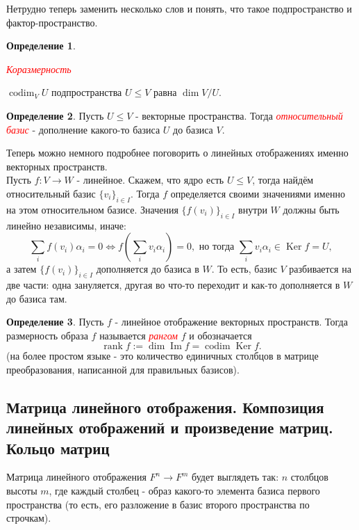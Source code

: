 \documentclass[a4paper,100pt]{article}
\theoremstyle{indented}
\theoremstyle{definition}
\newtheorem{defn}{Определение}
\theoremstyle{remark}
\DeclareMathOperator{\Ker}{Ker}
\DeclareMathOperator{\Imf}{Im}
\DeclareMathOperator{\codim}{codim}
\DeclareMathOperator{\rank}{rank}
\begin{document}
Нетрудно теперь заменить несколько слов и понять, что такое подпространство и фактор-пространство. 

\begin{defn}
    \hypertarget{n51}{\textcolor{red}{\textit{Коразмерность}}} $\codim_V U$ подпространства $U\leq V$ равна $\dim V/U$.
\end{defn}

\begin{defn}
    Пусть $U\leq V$ - векторные пространства. Тогда \hypertarget{n52}{\textcolor{red}{\textit{относительный базис}}} - дополнение какого-то базиса $U$ до базиса $V$.
\end{defn}

Теперь можно немного подробнее поговорить о линейных отображениях именно векторных пространств.\\ 

Пусть $f:V\rightarrow W$ - линейное. Скажем, что ядро есть $U\leq V$, тогда найдём относительный базис $\{v_i\}_{i\in I}$. Тогда $f$ определяется своими значениями именно на этом относительном базисе. Значения $\{f(v_i)\}_{i\in I}$ внутри $W$ должны быть линейно независимы, иначе:
\[
    \sum_i f(v_i)\alpha_i=0 \Leftrightarrow f(\sum_i v_i\alpha_i)=0, \text{ но тогда }\sum_i v_i\alpha_i\in \Ker f=U,
\]
а затем $\{f(v_i)\}_{i\in I}$ дополняется до базиса в $W$. То есть, базис $V$ разбивается на две части: одна зануляется, другая во что-то переходит и как-то дополняется в $W$ до базиса там.

\begin{defn}
    Пусть $f$ - линейное отображение векторных пространств. Тогда размерность образа $f$ называется \hypertarget{n53}{\textcolor{red}{\textit{рангом}}} $f$ и обозначается 
    \[
        \rank f:=\dim \Imf f=\codim \Ker f.
    \]
    (на более простом языке - это количество единичных столбцов в матрице преобразования, написанной для правильных базисов).
\end{defn}

\resetall

\subsection{Матрица линейного отображения. Композиция линейных отображений и произведение матриц. Кольцо матриц}

Матрица линейного отображения $F^n\rightarrow F^m$ будет выглядеть так: $n$ столбцов высоты $m$, где каждый столбец - образ какого-то элемента базиса первого пространства (то есть, его разложение в базис второго пространства по строчкам).\\
\end{document}
